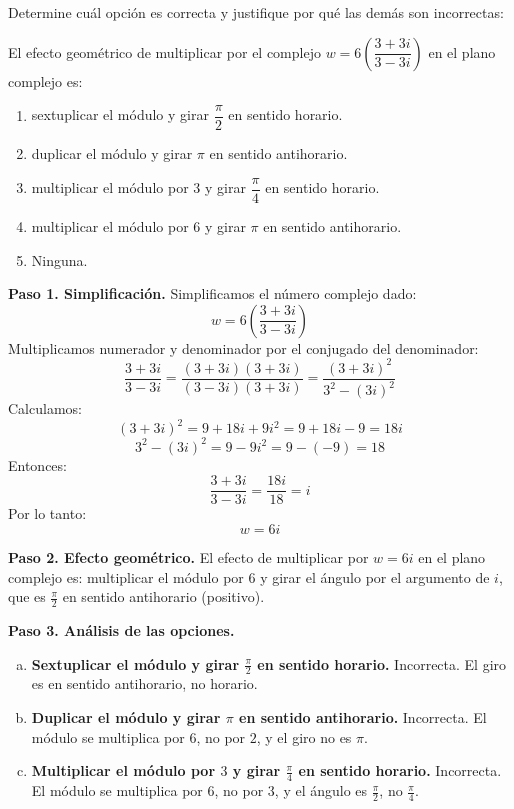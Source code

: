 \begin{prob} Determine cuál opción es correcta y justifique por qué las demás son incorrectas:

El efecto geométrico de multiplicar por el complejo $w=6\left(\dfrac{3+3i}{3-3i}\right)$ en el plano complejo es:

\begin{enumerate}[$(a)$]
\item sextuplicar el módulo y girar $\dfrac{\pi}{2}$ en sentido horario.
\item duplicar el módulo y girar $\pi$ en sentido antihorario.
\item multiplicar el módulo por $3$ y girar $\dfrac{\pi}{4}$ en sentido horario.
\item multiplicar el módulo por $6$ y girar $\pi$ en sentido antihorario.
\item Ninguna.					
\end{enumerate}


\begin{myproof}
\textbf{Paso 1. Simplificación.} Simplificamos el número complejo dado:
$$
w = 6\left(\frac{3+3i}{3-3i}\right)
$$
Multiplicamos numerador y denominador por el conjugado del denominador:
$$
\frac{3+3i}{3-3i} = \frac{(3+3i)(3+3i)}{(3-3i)(3+3i)} = \frac{(3+3i)^2}{3^2 - (3i)^2}
$$
Calculamos:
$$
(3+3i)^2 = 9 + 18i + 9i^2 = 9 + 18i - 9 = 18i
$$
$$
3^2 - (3i)^2 = 9 - 9i^2 = 9 - (-9) = 18
$$
Entonces:
$$
\frac{3+3i}{3-3i} = \frac{18i}{18} = i
$$
Por lo tanto:
$$
w = 6i
$$

\textbf{Paso 2. Efecto geométrico.} El efecto de multiplicar por $w=6i$ en el plano complejo es: multiplicar el módulo por $6$ y girar el ángulo por el argumento de $i$, que es $\frac{\pi}{2}$ en sentido antihorario (positivo).

\textbf{Paso 3. Análisis de las opciones.}

\begin{enumerate}[(a)]
\item \textbf{Sextuplicar el módulo y girar $\frac{\pi}{2}$ en sentido horario.}  
Incorrecta. El giro es en sentido antihorario, no horario.

\item \textbf{Duplicar el módulo y girar $\pi$ en sentido antihorario.}  
Incorrecta. El módulo se multiplica por $6$, no por $2$, y el giro no es $\pi$.

\item \textbf{Multiplicar el módulo por $3$ y girar $\frac{\pi}{4}$ en sentido horario.}  
Incorrecta. El módulo se multiplica por $6$, no por $3$, y el ángulo es $\frac{\pi}{2}$, no $\frac{\pi}{4}$.


\end{enumerate}
\end{myproof}
\end{prob}
